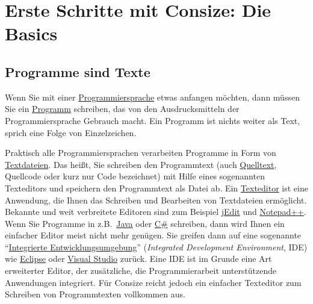 \chapter{Erste Schritte mit Consize: Die Basics}
\label{Sec:Basics}

\section{Programme sind Texte}

Wenn Sie mit einer \href{http://de.wikipedia.org/wiki/Programmiersprache}{Programmiersprache} etwas anfangen möchten, dann müssen Sie ein \href{http://de.wikipedia.org/wiki/Computerprogramm}{Programm} schreiben, das von den Ausdrucksmitteln der Programmiersprache Gebrauch macht. Ein Programm ist nichts weiter als Text, sprich eine Folge von Einzelzeichen.

Praktisch alle Programmiersprachen verarbeiten Programme in Form von \href{http://de.wikipedia.org/wiki/Textdatei}{Textdateien}. Das heißt, Sie schreiben den Programmtext (auch \href{http://de.wikipedia.org/wiki/Quelltext}{Quelltext}, Quellcode oder kurz nur Code bezeichnet) mit Hilfe eines sogenannten Texteditors und speichern den Programmtext als Datei ab. Ein \href{http://de.wikipedia.org/wiki/Texteditor}{Texteditor} ist eine Anwendung, die Ihnen das Schreiben und Bearbeiten von Textdateien ermöglicht. Bekannte und weit verbreitete Editoren sind zum Beispiel \href{http://www.jedit.org}{jEdit} und \href{http://www.notepad-plus-plus.org/}{Notepad++}. Wenn Sie Programme in z.B.\ \href{http://de.wikipedia.org/wiki/Java\_(Programmiersprache)}{Java} oder \href{http://de.wikipedia.org/wiki/C-Sharp}{C\#} schreiben, dann wird Ihnen ein einfacher Editor meist nicht mehr genügen. Sie greifen dann auf eine sogenannte "`\href{http://de.wikipedia.org/wiki/Integrierte\_Entwicklungsumgebung}{Integrierte Entwicklungsumgebung}"' (\emph{Integrated Development Environment}, IDE) wie \href{http://de.wikipedia.org/wiki/Eclipse\_(IDE)}{Eclipse} oder \href{http://de.wikipedia.org/wiki/Visual\_Studio}{Visual Studio} zurück. Eine IDE ist im Grunde eine Art erweiterter Editor, der zusätzliche, die Programmierarbeit unterstützende Anwendungen integriert. Für Consize reicht jedoch ein einfacher Texteditor zum Schreiben von Programmtexten vollkommen aus.

